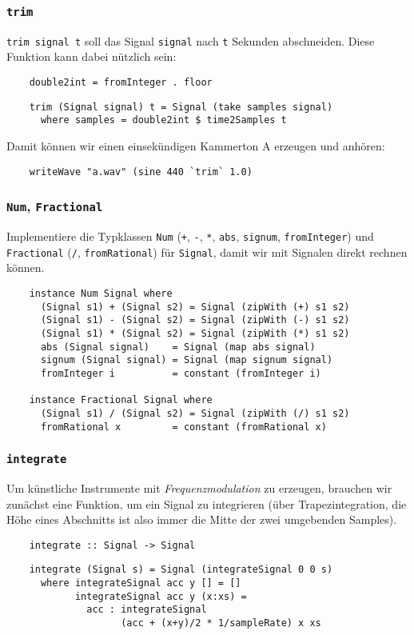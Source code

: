 \documentclass{beamer}
\begin{document}
\begin{frame}[fragile]
  \frametitle{\lstinline{trim}}
  \lstinline{trim signal t} soll das Signal \lstinline{signal} nach \lstinline{t} Sekunden abschneiden.
  Diese Funktion kann dabei nützlich sein:
  \begin{lstlisting}
    double2int = fromInteger . floor
  \end{lstlisting}
  \pause
  \begin{lstlisting}
    trim (Signal signal) t = Signal (take samples signal)
      where samples = double2int $ time2Samples t
  \end{lstlisting}
  Damit können wir einen einsekündigen Kammerton A erzeugen und anhören:
  \begin{lstlisting}
    writeWave "a.wav" (sine 440 `trim` 1.0)
  \end{lstlisting}
\end{frame}

\begin{frame}[fragile]
  \frametitle{\lstinline{Num}, \lstinline{Fractional}}
  Implementiere die Typklassen \lstinline{Num} (\lstinline{+}, \lstinline{-}, \lstinline{*}, \lstinline{abs}, \lstinline{signum}, \lstinline{fromInteger})
  und \lstinline{Fractional} (\lstinline{/}, \lstinline{fromRational}) für \lstinline{Signal},
  damit wir mit Signalen direkt rechnen können.
  \pause
  \begin{lstlisting}
    instance Num Signal where
      (Signal s1) + (Signal s2) = Signal (zipWith (+) s1 s2)
      (Signal s1) - (Signal s2) = Signal (zipWith (-) s1 s2)
      (Signal s1) * (Signal s2) = Signal (zipWith (*) s1 s2)
      abs (Signal signal)    = Signal (map abs signal)
      signum (Signal signal) = Signal (map signum signal)
      fromInteger i          = constant (fromInteger i)
    
    instance Fractional Signal where
      (Signal s1) / (Signal s2) = Signal (zipWith (/) s1 s2)
      fromRational x         = constant (fromRational x)
  \end{lstlisting}
\end{frame}

\begin{frame}[fragile]
  \frametitle{\lstinline{integrate}}
  Um künstliche Instrumente mit \emph{Frequenzmodulation} zu erzeugen,
  brauchen wir zunächst eine Funktion,
  um ein Signal zu integrieren (über Trapezintegration,
  die Höhe eines Abschnitts ist also immer die Mitte der zwei umgebenden Samples).
  \begin{lstlisting}
    integrate :: Signal -> Signal
  \end{lstlisting}
  \pause
  \begin{lstlisting}
    integrate (Signal s) = Signal (integrateSignal 0 0 s)
      where integrateSignal acc y [] = []
            integrateSignal acc y (x:xs) =
              acc : integrateSignal
                    (acc + (x+y)/2 * 1/sampleRate) x xs
  \end{lstlisting}
\end{frame}
\end{document}
